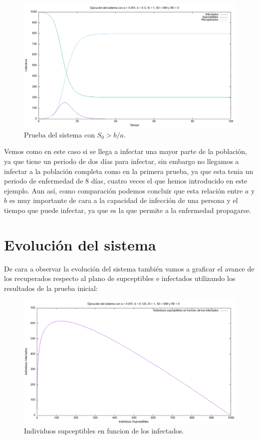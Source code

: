 \documentclass[12pt, spanish]{article}
\begin{document}
\begin{figure}[H]
  \centering
      \includegraphics[width=\textwidth]{SIR_s0_mayor.png}
 		\caption{Prueba del sistema con $S_0 > b/a$.}
\end{figure}

Vemos como en este caso si se llega a infectar una mayor parte de la población, ya que tiene un periodo de dos días para infectar, sin embargo no llegamos a infectar a la población completa como en la primera prueba, ya que esta tenia un periodo de enfermedad de 8 días, cuatro veces el que hemos introducido en este ejemplo. Aun así, como comparación podemos concluir que esta relación entre $a$ y $b$ es muy importante de cara a la capacidad de infección de una persona y el tiempo que puede infectar, ya que es la que permite a la enfermedad propagarse.




\section{Evolución del sistema}

De cara a observar la evolución del sistema también vamos a graficar el avance de los recuperados respecto al plano de supceptibles e infectados utilizando los resultados de la prueba inicial:


\begin{figure}[H]
  \centering
      \includegraphics[width=\textwidth]{SIR_planoSI.png}
 		\caption{Individuos supceptibles en funcion de los infectados.}
\end{figure}
\end{document}
